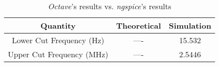 \begin{center}
    \begin{table}[H]
        \centering
        \begin{tabular}{c|c|c}
          \textbf{Quantity} & \textbf{Theoretical}  & \textbf{Simulation}  \\
          \hline
            Lower Cut Frequency (Hz) &  ---- &  15.532 \\
            Upper Cut Frequency (MHz)&  ---- &  2.5446 \\
        \end{tabular}
        \caption{\textit{Octave}'s results vs. \textit{ngspice}'s results}
    \end{table}
\end{center}

